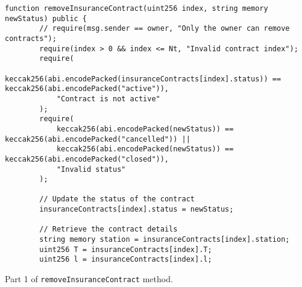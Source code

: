 \documentclass[10pt]{article}
\begin{document}
\begin{codefragment}[!h]
\begin{lstlisting}[language=Solidity]
    function removeInsuranceContract(uint256 index, string memory newStatus) public {
        // require(msg.sender == owner, "Only the owner can remove contracts");
        require(index > 0 && index <= Nt, "Invalid contract index");
        require(
            keccak256(abi.encodePacked(insuranceContracts[index].status)) == keccak256(abi.encodePacked("active")),
            "Contract is not active"
        );
        require(
            keccak256(abi.encodePacked(newStatus)) == keccak256(abi.encodePacked("cancelled")) ||
            keccak256(abi.encodePacked(newStatus)) == keccak256(abi.encodePacked("closed")),
            "Invalid status"
        );

        // Update the status of the contract
        insuranceContracts[index].status = newStatus;

        // Retrieve the contract details
        string memory station = insuranceContracts[index].station;
        uint256 T = insuranceContracts[index].T;
        uint256 l = insuranceContracts[index].l;
                \end{lstlisting}
    \caption{Part 1 of \texttt{removeInsuranceContract} method.}
    \label{code:removeInsuranceContract_1}
\end{codefragment}
\end{document}
